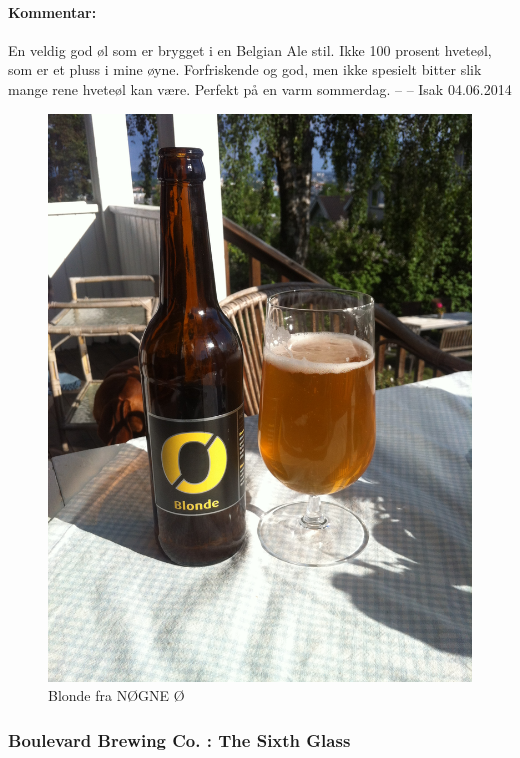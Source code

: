 \documentclass[12pt,a4paper,oneside,norsk]{article}
\begin{document}
\paragraph{Kommentar:} En veldig god øl som er brygget i en Belgian Ale stil. Ikke 100 prosent hveteøl, som er et pluss i mine øyne. Forfriskende og god, men ikke spesielt bitter slik mange rene hveteøl kan være. Perfekt på en varm sommerdag. 
\newline
-- -- Isak 04.06.2014

\begin{figure} [H]
\centering
\includegraphics[scale=0.1, angle=270]{Bilder/Ol/nogneblonde}
\caption{Blonde fra NØGNE Ø}
\end{figure}

\newpage
\subsubsection{Boulevard Brewing Co. : The Sixth Glass}
\end{document}
